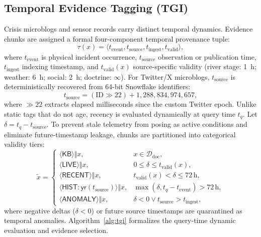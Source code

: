 \documentclass[conference]{IEEEtran}
\begin{document}
\subsection{Temporal Evidence Tagging (TGI)}
Crisis microblogs and sensor records carry distinct temporal dynamics. Evidence chunks are assigned a formal four-component temporal provenance tuple:
\begin{equation}
\tau(x) = \langle t_{\mathrm{event}}, t_{\mathrm{source}}, t_{\mathrm{ingest}}, t_{\mathrm{valid}} \rangle,
\label{eq:tuple}
\end{equation}
where $t_{\mathrm{event}}$ is physical incident occurrence, $t_{\mathrm{source}}$ observation or publication time, $t_{\mathrm{ingest}}$ indexing timestamp, and $t_{\mathrm{valid}}(x)$ source-specific validity (river stage: 1~h; weather: 6~h; social: 2~h; doctrine: $\infty$). For Twitter/X microblogs, $t_{\mathrm{source}}$ is deterministically recovered from 64-bit Snowflake identifiers:
\begin{equation}
t_{\mathrm{source}} = (\mathrm{ID} \gg 22) + 1{,}288{,}834{,}974{,}657,
\label{eq:snow}
\end{equation}
where $\gg 22$ extracts elapsed milliseconds since the custom Twitter epoch. Unlike static tags that do not age, recency is evaluated dynamically at query time $t_q$. Let $\delta = t_q - t_{\mathrm{source}}$. To prevent stale telemetry from posing as active conditions and eliminate future-timestamp leakage, chunks are partitioned into categorical validity tiers:
\begin{equation}
\tilde{x} =
\begin{cases}
\langle\mathsf{KB}\rangle \Vert x, & x \in \mathcal{D}_{\mathrm{doc}},\\[2pt]
\langle\mathsf{LIVE}\rangle \Vert x, & 0 \le \delta \le t_{\mathrm{valid}}(x),\\[2pt]
\langle\mathsf{RECENT}\rangle \Vert x, & t_{\mathrm{valid}}(x) < \delta \le 72\,\text{h},\\[2pt]
\langle\mathsf{HIST:yr}(t_{\mathrm{source}})\rangle \Vert x, & \max(\delta, t_q{-}t_{\mathrm{event}}) > 72\,\text{h},\\[2pt]
\langle\mathsf{ANOMALY}\rangle \Vert x, & \delta < 0 \lor t_{\mathrm{source}} > t_{\mathrm{ingest}},
\end{cases}
\label{eq:tgi}
\end{equation}
where negative deltas ($\delta < 0$) or future source timestamps are quarantined as temporal anomalies. Algorithm~\ref{alg:tgi} formalizes the query-time dynamic evaluation and evidence selection.
\end{document}
